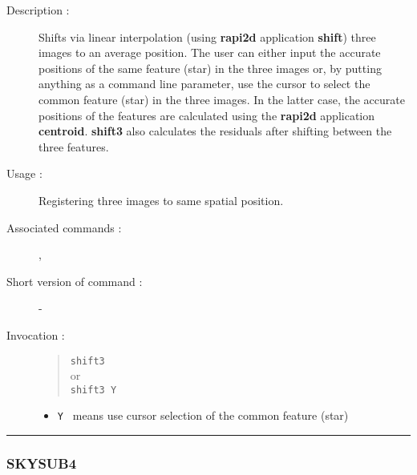 \begin{description}

\item[Description :] Shifts via linear interpolation (using {\bf
rapi2d} application {\bf shift}) three images to an average position.
The user can either input the accurate positions of the same feature
(star) in the three images or, by putting anything as a command line
parameter, use the cursor to select the common feature (star) in the
three images. In the latter case, the accurate positions of the
features are calculated using the {\bf rapi2d} application {\bf
centroid}.  {\bf shift3} also calculates the residuals after shifting
between the three features.

\item[Usage :] Registering three images to same spatial position.

\item[Associated commands :] {\tt {}},
{\tt {}}

\item[Short version of command :] -
\item[Invocation :]

\begin{quote}{\tt  shift3 }\\
or \\
{\tt shift3 Y }
\end{quote}

\begin{itemize}

\item {\tt Y }  means use cursor selection of the common feature (star)
\end{itemize}

\end{description}

\hrule
\subsubsection*{\label{SKYSUB4}SKYSUB4}

